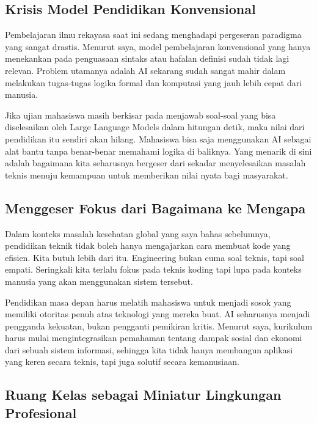 \documentclass[
  letterpaper,
  DIV=11,
  numbers=noendperiod]{scrreprt}
\begin{document}
\subsection{Krisis Model Pendidikan
Konvensional}\label{krisis-model-pendidikan-konvensional}

Pembelajaran ilmu rekayasa saat ini sedang menghadapi pergeseran
paradigma yang sangat drastis. Menurut saya, model pembelajaran
konvensional yang hanya menekankan pada penguasaan sintaks atau hafalan
definisi sudah tidak lagi relevan. Problem utamanya adalah AI sekarang
sudah sangat mahir dalam melakukan tugas-tugas logika formal dan
komputasi yang jauh lebih cepat dari manusia.

Jika ujian mahasiswa masih berkisar pada menjawab soal-soal yang bisa
diselesaikan oleh Large Language Models dalam hitungan detik, maka nilai
dari pendidikan itu sendiri akan hilang. Mahasiswa bisa saja menggunakan
AI sebagai alat bantu tanpa benar-benar memahami logika di baliknya.
Yang menarik di sini adalah bagaimana kita seharusnya bergeser dari
sekadar menyelesaikan masalah teknis menuju kemampuan untuk memberikan
nilai nyata bagi masyarakat.

\subsection{Menggeser Fokus dari Bagaimana ke
Mengapa}\label{menggeser-fokus-dari-bagaimana-ke-mengapa}

Dalam konteks masalah kesehatan global yang saya bahas sebelumnya,
pendidikan teknik tidak boleh hanya mengajarkan cara membuat kode yang
efisien. Kita butuh lebih dari itu. Engineering bukan cuma soal teknis,
tapi soal empati. Seringkali kita terlalu fokus pada teknis koding tapi
lupa pada konteks manusia yang akan menggunakan sistem tersebut.

Pendidikan masa depan harus melatih mahasiswa untuk menjadi sosok yang
memiliki otoritas penuh atas teknologi yang mereka buat. AI seharusnya
menjadi pengganda kekuatan, bukan pengganti pemikiran kritis. Menurut
saya, kurikulum harus mulai mengintegrasikan pemahaman tentang dampak
sosial dan ekonomi dari sebuah sistem informasi, sehingga kita tidak
hanya membangun aplikasi yang keren secara teknis, tapi juga solutif
secara kemanusiaan.

\subsection{Ruang Kelas sebagai Miniatur Lingkungan
Profesional}\label{ruang-kelas-sebagai-miniatur-lingkungan-profesional}
\end{document}
